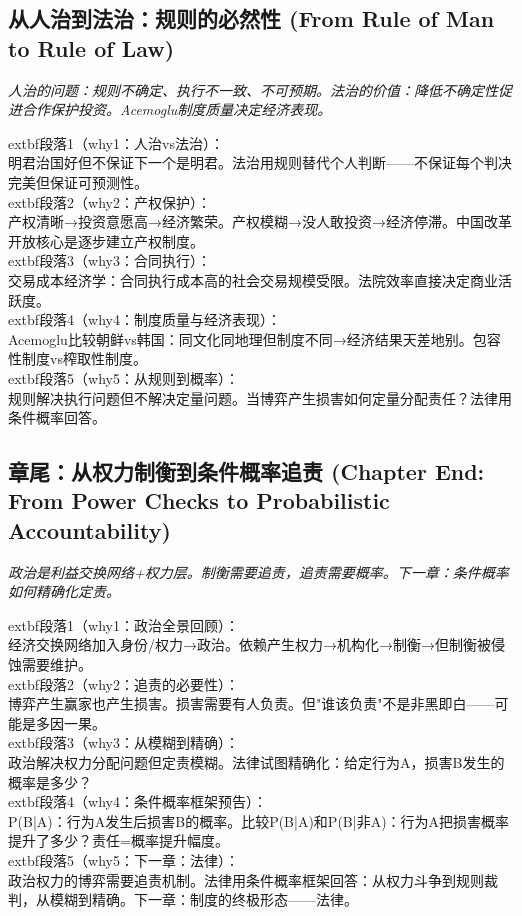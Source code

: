 \documentclass[a4paper,12pt]{book}
\newenvironment{motivation}{\begin{tcolorbox}[colback=gray!10,colframe=gray!60,title=\textit{本章动机},fonttitle=\bfseries,arc=0mm,leftrule=3mm]\small\itshape}{\end{tcolorbox}}
\begin{document}
\begin{motivation}
\begin{motivation}
\begin{motivation}
	\subsection{从人治到法治：规则的必然性 (From Rule of Man to Rule of Law)}
	\begin{motivation}人治的问题：规则不确定、执行不一致、不可预期。法治的价值：降低不确定性促进合作保护投资。Acemoglu制度质量决定经济表现。\end{motivation}
		extbf{段落1（why1：人治vs法治）}：\\明君治国好但不保证下一个是明君。法治用规则替代个人判断——不保证每个判决完美但保证可预测性。\\	extbf{段落2（why2：产权保护）}：\\产权清晰→投资意愿高→经济繁荣。产权模糊→没人敢投资→经济停滞。中国改革开放核心是逐步建立产权制度。\\	extbf{段落3（why3：合同执行）}：\\交易成本经济学：合同执行成本高的社会交易规模受限。法院效率直接决定商业活跃度。\\	extbf{段落4（why4：制度质量与经济表现）}：\\Acemoglu比较朝鲜vs韩国：同文化同地理但制度不同→经济结果天差地别。包容性制度vs榨取性制度。\\	extbf{段落5（why5：从规则到概率）}：\\规则解决执行问题但不解决定量问题。当博弈产生损害如何定量分配责任？法律用条件概率回答。

	\subsection{章尾：从权力制衡到条件概率追责 (Chapter End: From Power Checks to Probabilistic Accountability)}
	\begin{motivation}政治是利益交换网络+权力层。制衡需要追责，追责需要概率。下一章：条件概率如何精确化定责。\end{motivation}
		extbf{段落1（why1：政治全景回顾）}：\\经济交换网络加入身份/权力→政治。依赖产生权力→机构化→制衡→但制衡被侵蚀需要维护。\\	extbf{段落2（why2：追责的必要性）}：\\博弈产生赢家也产生损害。损害需要有人负责。但"谁该负责"不是非黑即白——可能是多因一果。\\	extbf{段落3（why3：从模糊到精确）}：\\政治解决权力分配问题但定责模糊。法律试图精确化：给定行为A，损害B发生的概率是多少？\\	extbf{段落4（why4：条件概率框架预告）}：\\P(B|A)：行为A发生后损害B的概率。比较P(B|A)和P(B|非A)：行为A把损害概率提升了多少？责任=概率提升幅度。\\	extbf{段落5（why5：下一章：法律）}：\\政治权力的博弈需要追责机制。法律用条件概率框架回答：从权力斗争到规则裁判，从模糊到精确。下一章：制度的终极形态——法律。



\end{motivation}
\end{motivation}
\end{motivation}
\end{document}
